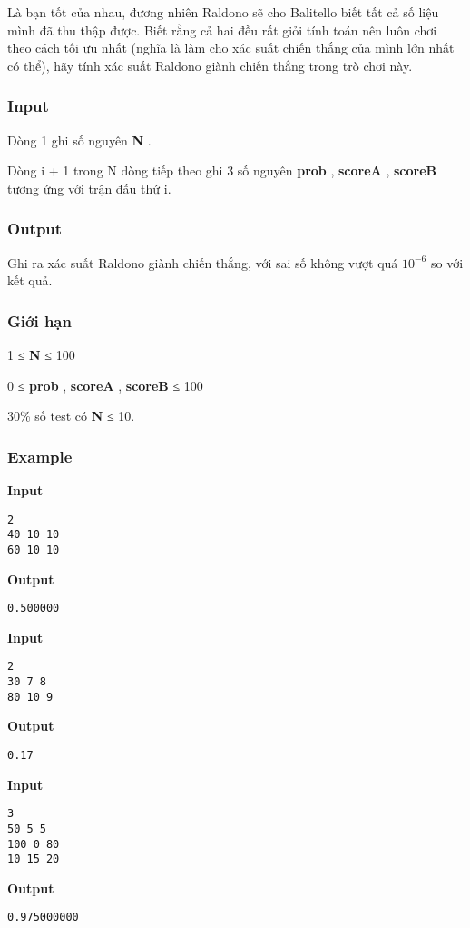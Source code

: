 Là bạn tốt của nhau, đương nhiên Raldono sẽ cho Balitello biết tất cả số liệu mình đã thu thập được. Biết rằng cả hai đều rất giỏi tính toán nên luôn chơi theo cách tối ưu nhất (nghĩa là làm cho xác suất chiến thắng của mình lớn nhất có thể), hãy tính xác suất Raldono giành chiến thắng trong trò chơi này.

\subsubsection{Input}

Dòng 1 ghi số nguyên \textbf{ N } .

Dòng i + 1 trong N dòng tiếp theo ghi 3 số nguyên \textbf{ prob } , \textbf{ scoreA } , \textbf{ scoreB } tương ứng với trận đấu thứ i.

\subsubsection{Output}

Ghi ra xác suất Raldono giành chiến thắng, với sai số không vượt quá $10^{-6}$ so với kết quả.

\subsubsection{Giới hạn}

1 ≤ \textbf{ N } ≤ 100

0 ≤ \textbf{ prob } , \textbf{ scoreA } , \textbf{ scoreB } ≤ 100

30\% số test có \textbf{ N } ≤ 10.

\subsubsection{Example}

\textbf{Input }
\begin{verbatim}
2
40 10 10
60 10 10\end{verbatim}

\textbf{Output }
\begin{verbatim}
0.500000\end{verbatim}

\textbf{Input }
\begin{verbatim}
2
30 7 8
80 10 9\end{verbatim}

\textbf{Output }
\begin{verbatim}
0.17\end{verbatim}

\textbf{Input }
\begin{verbatim}
3
50 5 5
100 0 80
10 15 20\end{verbatim}

\textbf{Output }
\begin{verbatim}
0.975000000\end{verbatim}
